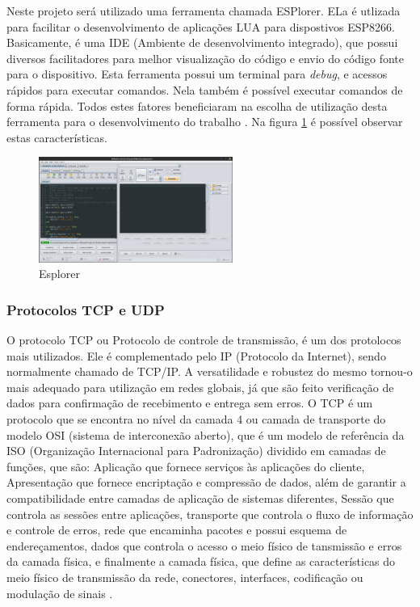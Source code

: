 \documentclass[journal]{IEEEtran}
\begin{document}
Neste projeto será utilizado uma ferramenta chamada ESPlorer. ELa é utlizada para facilitar o desenvolvimento de aplicações LUA para dispostivos ESP8266. Basicamente, é uma IDE (Ambiente de desenvolvimento integrado), que possui diversos facilitadores para melhor visualização do código e envio do código fonte para o dispositivo. Esta ferramenta possui um terminal para \emph{debug}, e acessos rápidos para executar comandos. Nela também é possível executar comandos de forma rápida. Todos estes fatores beneficiaram na escolha de utilização desta ferramenta para o desenvolvimento do trabalho \cite{ESPlorer}. Na figura \ref{esplorer} é possível observar estas características.

\begin{figure}[h]
\centering
\includegraphics[width=2.5in]{esplorer}
\caption{Esplorer \cite{ESPlorer}}
\label{esplorer}
\end{figure}

\subsubsection{Protocolos TCP e UDP}
O protocolo TCP ou Protocolo de controle de transmissão, é um dos protolocos mais utilizados. Ele é complementado pelo IP (Protocolo da Internet), sendo normalmente chamado de TCP/IP. A versatilidade e robustez do mesmo tornou-o mais adequado para utilização em redes globais, já que são feito verificação de dados para confirmação de recebimento e entrega sem erros. O TCP é um protocolo que se encontra no nível da camada 4 ou camada de transporte do modelo OSI (sistema de interconexão aberto), que é um modelo de referência da ISO (Organização Internacional para Padronização) dividido em camadas de funções, que são: Aplicação que fornece serviços às aplicações do cliente, Apresentação que fornece encriptação e compressão de dados, além de garantir a compatibilidade entre camadas de aplicação de sistemas diferentes, Sessão que controla as sessões entre aplicações, transporte que controla o fluxo de informação e controle de erros, rede que encaminha pacotes e possui esquema de endereçamentos, dados que controla o acesso o meio físico de tansmissão e erros da camada física, e finalmente a camada física, que define as características do meio físico de transmissão da rede, conectores, interfaces, codificação ou modulação de sinais \cite{pplwareosi}\cite{VintonTCP}.
\end{document}
